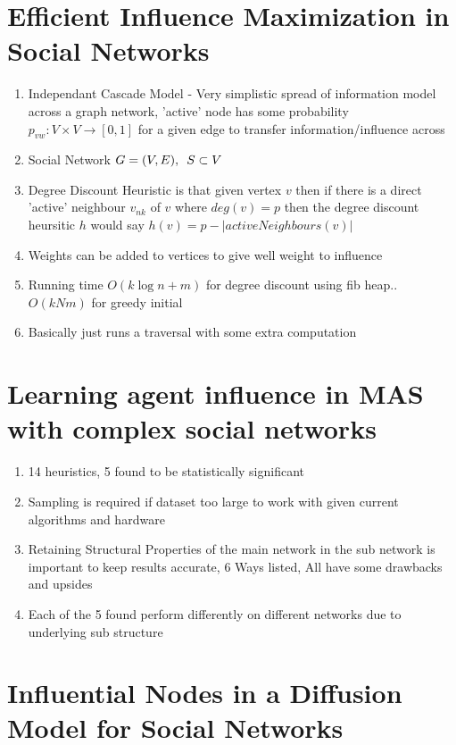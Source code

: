\documentclass{article}
\begin{document}
\section{Efficient Influence Maximization in Social Networks}
\cite{chen2009efficient}

\begin{enumerate}
    \item Independant Cascade Model - Very simplistic spread of information model across a graph network, 'active' node has some probability $p_{vw}:V \times V \to [0,1]$ for a given edge to transfer information/influence across
    \item  Social Network $G=(V,E), \hspace{0.5em}S \subset V$
    \item Degree Discount Heuristic is that given vertex $v$ then if there is a direct 'active' neighbour $v_{nk}$ of $v$ where $deg(v) = p$ then the degree discount heursitic $h$ would say $h(v) = p - |activeNeighbours(v)|$
    \item Weights can be added to vertices to give well weight to influence
    \item Running time $O(k\log n + m)$ for degree discount using fib heap.. $O(kNm)$ for greedy initial
    \item Basically just runs a traversal with some extra computation
\end{enumerate}

\section{Learning agent influence in MAS with complex
  social networks}
\cite{franks2014learning}

\begin{enumerate}
  \item 14 heuristics, 5 found to be statistically significant
  \item Sampling is required if dataset too large to work with given current algorithms and hardware
  \item Retaining Structural Properties of the main network in the sub network is important to keep results accurate, 6 Ways listed, All have some drawbacks and upsides
  \item Each of the 5 found perform differently on different networks due to underlying sub structure
\end{enumerate}

\section{Influential Nodes in a Diffusion Model for Social
  Networks}
\cite{kempe2005influential}
\end{document}
